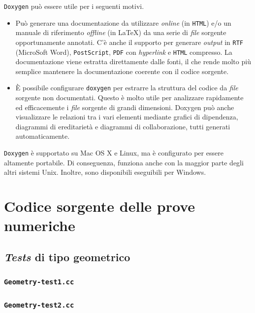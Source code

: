 \texttt{Doxygen} può essere utile per i seguenti motivi.
\begin{itemize}
	\item Può generare una documentazione da utilizzare \textit{online} (in \texttt{HTML}) e/o un manuale di riferimento \textit{offline} (in \LaTeX) da una serie di \textit{file} sorgente opportunamente annotati. C'è anche il supporto per generare \textit{output} in \texttt{RTF} (MicroSoft Word), \texttt{PostScript}, \texttt{PDF} con \textit{hyperlink} e \texttt{HTML} compresso. La documentazione viene estratta direttamente dalle fonti, il che rende molto più semplice mantenere la documentazione coerente con il codice sorgente.
	\item È possibile configurare \texttt{doxygen} per estrarre la struttura del codice da \textit{file} sorgente non documentati. Questo è molto utile per analizzare rapidamente ed efficacemente i \textit{file} sorgente di grandi dimensioni. Doxygen può anche visualizzare le relazioni tra i vari elementi mediante grafici di dipendenza, diagrammi di ereditarietà e diagrammi di collaborazione, tutti generati automaticamente.
\end{itemize}
\texttt{Doxygen} è supportato su Mac OS X e Linux, ma è configurato per essere altamente portabile. Di conseguenza, funziona anche con la maggior parte degli altri sistemi Unix. Inoltre, sono disponibili eseguibili per Windows.



\chapter{Codice sorgente delle prove numeriche}
\label{TestsCode}
%
\section{\textit{Tests} di tipo geometrico}
%
\subsection{\texttt{Geometry-test1.cc}}
\renewcommand{\baselinestretch}{1.0}

\renewcommand{\baselinestretch}{1.25}
%
\subsection{\texttt{Geometry-test2.cc}}
\renewcommand{\baselinestretch}{1.0}

\renewcommand{\baselinestretch}{1.25}
%
